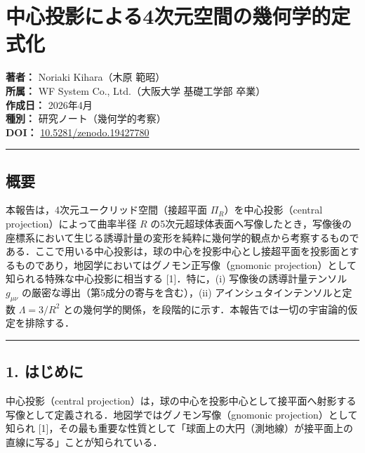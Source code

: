 \documentclass[a4paper,11pt]{ltjsarticle}
\theoremstyle{definition}
\begin{document}
\section{中心投影による4次元空間の幾何学的定式化}\label{ux4e2dux5fc3ux6295ux5f71ux306bux3088ux308b4ux6b21ux5143ux7a7aux9593ux306eux5e7eux4f55ux5b66ux7684ux5b9aux5f0fux5316}

\textbf{著者：} Noriaki Kihara（木原 範昭）\\
\textbf{所属：} WF System Co., Ltd.（大阪大学 基礎工学部 卒業）\\
\textbf{作成日：} 2026年4月\\
\textbf{種別：} 研究ノート（幾何学的考察）\\
\textbf{DOI：} \href{https://doi.org/10.5281/zenodo.19427780}{10.5281/zenodo.19427780}

\begin{center}\rule{0.5\linewidth}{0.5pt}\end{center}

\subsection{概要}\label{ux6982ux8981}

本報告は，4次元ユークリッド空間（接超平面 \(\Pi_R\)）を中心投影（central projection）によって曲率半径 \(R\) の5次元超球体表面へ写像したとき，写像後の座標系において生じる誘導計量の変形を純粋に幾何学的観点から考察するものである．ここで用いる中心投影は，球の中心を投影中心とし接超平面を投影面とするものであり，地図学においてはグノモン正写像（gnomonic projection）として知られる特殊な中心投影に相当する {[}1{]}．特に，(i) 写像後の誘導計量テンソル \(g_{\mu\nu}\) の厳密な導出（第5成分の寄与を含む），(ii) アインシュタインテンソルと定数 \(\Lambda = 3/R^2\) との幾何学的関係，を段階的に示す．本報告では一切の宇宙論的仮定を排除する．

\begin{center}\rule{0.5\linewidth}{0.5pt}\end{center}

\subsection{1. はじめに}\label{ux306fux3058ux3081ux306b}

中心投影（central projection）は，球の中心を投影中心として接平面へ射影する写像として定義される．地図学ではグノモン写像（gnomonic projection）として知られ {[}1{]}，その最も重要な性質として「球面上の大円（測地線）が接平面上の直線に写る」ことが知られている．
\end{document}
